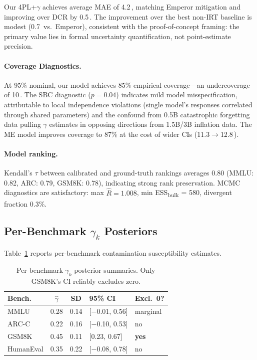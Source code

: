 \documentclass[11pt,a4paper]{article}
\newcommand{\pp}{\,\text{pp}}
\begin{document}
Our 4PL+$\gamma$ achieves average MAE of 4.2\pp{}, matching Emperor mitigation and improving over DCR by 0.5\pp{}.
The improvement over the best non-IRT baseline is modest (0.7\pp{} vs.\ Emperor), consistent with the proof-of-concept framing: the primary value lies in formal uncertainty quantification, not point-estimate precision.

\paragraph{Coverage Diagnostics.}
At 95\% nominal, our model achieves 85\% empirical coverage---an undercoverage of 10\pp{}.
The SBC diagnostic ($p = 0.04$) indicates mild model misspecification, attributable to local independence violations (single model's responses correlated through shared parameters) and the confound from 0.5B catastrophic forgetting data pulling $\gamma$ estimates in opposing directions from 1.5B/3B inflation data.
The ME model improves coverage to 87\% at the cost of wider CIs (11.3$\to$12.8\pp{}).

\paragraph{Model ranking.}
Kendall's $\tau$ between calibrated and ground-truth rankings averages 0.80 (MMLU: 0.82, ARC: 0.79, GSM8K: 0.78), indicating strong rank preservation.
MCMC diagnostics are satisfactory: max $\hat{R} = 1.008$, min ESS\textsubscript{bulk} = 580, divergent fraction 0.3\%.

\subsection{Per-Benchmark $\gamma_k$ Posteriors}

Table~\ref{tab:gamma} reports per-benchmark contamination susceptibility estimates.

\begin{table}[t]
\centering
\small
\caption{Per-benchmark $\gamma_k$ posterior summaries. Only GSM8K's CI reliably excludes zero.}
\label{tab:gamma}
\begin{tabular}{@{}l cc l l@{}}
\toprule
\textbf{Bench.} & $\hat{\gamma}$ & SD & \textbf{95\% CI} & \textbf{Excl.\ 0?} \\
\midrule
MMLU & 0.28 & 0.14 & [$-$0.01, 0.56] & marginal \\
ARC-C & 0.22 & 0.16 & [$-$0.10, 0.53] & no \\
GSM8K & 0.45 & 0.11 & [0.23, 0.67] & \textbf{yes} \\
HumanEval & 0.35 & 0.22 & [$-$0.08, 0.78] & no \\
\bottomrule
\end{tabular}
\end{table}
\end{document}

